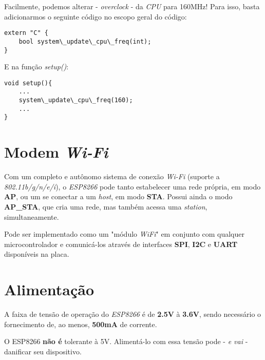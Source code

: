 \documentclass[
	11pt,				%
	openright,			%
	twoside,			%
	a5paper,			%
	english,			%
	french,				%
	spanish,			%
	brazil,				%
	sumario=tradicional
]{abntex2}
\begin{document}
          \begin{tcolorbox}[colbacktitle=green!50!white!60,
title={\vspace{-13pt}\texttt{[image: notebook.png]} \hspace{2pt} \textsf{\textbf{Na Prática...}\vspace{4pt}}},coltitle=black, colback=white,arc=4mm, outer arc=3.5mm]
\raggedright

Facilmente, podemos alterar - \textit{overclock} - da \textit{CPU} para 160MHz! Para isso, basta adicionarmos o seguinte código no escopo geral do código:
\begin{lstlisting}
extern "C" {
    bool system\_update\_cpu\_freq(int);
}

\end{lstlisting}

E na função \emph{setup()}:
\begin{lstlisting}
void setup(){
    ...
    system\_update\_cpu\_freq(160);
    ...
}
\end{lstlisting}
\end{tcolorbox}


\section{Modem \textit{Wi-Fi}}
Com um completo e autônomo sistema de conexão \textit{Wi-Fi} (suporte a \textit{802.11b/g/n/e/i}), o \textit{ESP8266} pode tanto estabelecer uma rede própria, em modo \textbf{\textsf{AP}}, ou um se conectar a um \textit{host}, em modo \textbf{\textsf{STA}}. Possui ainda o modo \textbf{\textsf{AP\_STA}}, que cria uma rede, mas também acessa uma \textit{station}, simultaneamente. 

Pode ser implementado como um "módulo \emph{WiFi}" em conjunto com qualquer microcontrolador e comunicá-los através de interfaces \textbf{\textsf{SPI}}, \textbf{\textsf{I2C}} e \textbf{\textsf{UART}} disponíveis na placa. 



\section{Alimentação}

A faixa de tensão de operação do \textit{ESP8266} é de \textbf{\textsf{2.5V}} à \textbf{\textsf{3.6V}}, sendo necessário o fornecimento de, ao menos, \textbf{\textsf{500mA}} de corrente.
\vspace{5pt}

\begin{tcolorbox}[colbacktitle=red!65!white,
title={\vspace{-13pt}\texttt{[image: x.png]} \hspace{2pt} \textsf{\textbf{CUIDADO!}\vspace{2pt}}},coltitle=black, colback=white,arc=4mm, outer arc=3.5mm]
\raggedright
 O ESP8266 \textsf{\textbf{não é}} tolerante à 5V. Alimentá-lo com essa tensão pode - \textit{e vai} - danificar seu dispositivo.
\end{tcolorbox}
\end{document}

